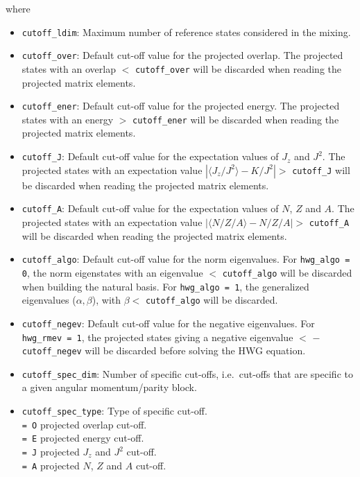 \documentclass[a4paper,11pt]{article}
\newcommand{\ttt}[1]{\texttt{#1}}
\begin{document}
where
\begin{itemize}
\item \ttt{cutoff\_ldim}: Maximum number of reference states considered in the mixing.
\item \ttt{cutoff\_over}: Default cut-off value for the projected overlap. The projected states with an overlap $<$ \ttt{cutoff\_over} will be discarded when reading the projected matrix elements.
\item \ttt{cutoff\_ener}: Default cut-off value for the projected energy. The projected states with an energy $>$ \ttt{cutoff\_ener} will be discarded when reading the projected matrix elements.
\item \ttt{cutoff\_J}: Default cut-off value for the expectation values of $J_z$ and $J^2$. The projected states with an expectation value $|\langle J_z/J^2 \rangle - K/J^2| >$ \ttt{cutoff\_J}
      will be discarded when reading the projected matrix elements.
\item \ttt{cutoff\_A}: Default cut-off value for the expectation values of $N$, $Z$ and $A$. The projected states with an expectation value $|\langle N/Z/A \rangle - N/Z/A| >$ \ttt{cutoff\_A}
      will be discarded when reading the projected matrix elements.
\item \ttt{cutoff\_algo}: Default cut-off value for the norm eigenvalues. For \ttt{hwg\_algo = 0}, the norm eigenstates with an eigenvalue $<$ \ttt{cutoff\_algo} will be discarded when 
      building the natural basis. For \ttt{hwg\_algo = 1}, the generalized eigenvalues ($\alpha,\beta$), with $\beta <$ \ttt{cutoff\_algo} will be discarded.
\item \ttt{cutoff\_negev}: Default cut-off value for the negative eigenvalues. For \ttt{hwg\_rmev = 1}, the projected states giving a negative eigenvalue $<$ $-$\ttt{cutoff\_negev} 
      will be discarded before solving the HWG equation.
\item \ttt{cutoff\_spec\_dim}: Number of specific cut-offs, i.e.\ cut-offs that are specific to a given angular momentum/parity block.
\item \ttt{cutoff\_spec\_type}: Type of specific cut-off. \\[0.05cm]
 \ttt{= O\:} projected overlap cut-off. \\[0.05cm]
 \ttt{= E\:} projected energy cut-off. \\[0.05cm]
 \ttt{= J\:} projected $J_z$ and $J^2$ cut-off. \\[0.05cm]
 \ttt{= A\:} projected $N$, $Z$ and $A$ cut-off. \\[0.05cm]

\end{itemize}
\end{document}
